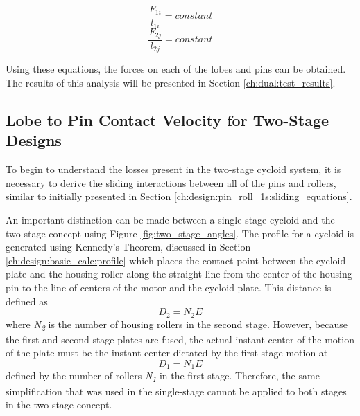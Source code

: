 \begin{equation} 
\frac{F_{1i}}{l_{1i}} = constant 
\end{equation}
\begin{equation}
\frac{F_{2j}}{l_{2j}} = constant
\end{equation}

Using these equations, the forces on each of the lobes and pins can be obtained. The results of this analysis will be presented in Section \ref{ch:dual:test_results}.

\subsection{Lobe to Pin Contact Velocity for Two-Stage Designs}\label{ch:dual:equations:vel}
To begin to understand the losses present in the two-stage cycloid system, it is necessary to derive the sliding interactions between all of the pins and rollers, similar to initially presented in Section \ref{ch:design:pin_roll_1s:sliding_equations}.

An important distinction can be made between a single-stage cycloid and the two-stage concept using Figure \ref{fig:two_stage_angles}. The profile for a cycloid is generated using Kennedy's Theorem, discussed in Section \ref{ch:design:basic_calc:profile} which places the contact point between the cycloid plate and the housing roller along the straight line from the center of the housing pin to the line of centers of the motor and the cycloid plate. This distance is defined as 
\begin{equation}
D_2 = N_2 E
\end{equation} 
where \textit{N\textsubscript{2}} is the number of housing rollers in the second stage. However, because the first and second stage plates are fused, the actual instant center of the motion of the plate must be the instant center dictated by the first stage motion at 
\begin{equation}
D_1 = N_1 E 
\end{equation} 
defined by the number of rollers \textit{N\textsubscript{1}} in the first stage. Therefore, the same simplification that was used in the single-stage cannot be applied to both stages in the two-stage concept. 

